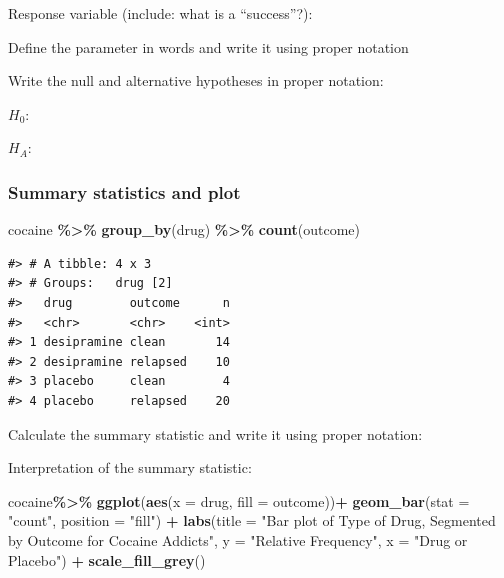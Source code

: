 \documentclass[
]{report}
\newenvironment{Shaded}{\begin{snugshade}}{\end{snugshade}}
\newcommand{\AttributeTok}[1]{\textcolor[rgb]{0.13,0.29,0.53}{#1}}
\newcommand{\FunctionTok}[1]{\textcolor[rgb]{0.13,0.29,0.53}{\textbf{#1}}}
\newcommand{\NormalTok}[1]{#1}
\newcommand{\SpecialCharTok}[1]{\textcolor[rgb]{0.81,0.36,0.00}{\textbf{#1}}}
\newcommand{\StringTok}[1]{\textcolor[rgb]{0.31,0.60,0.02}{#1}}
\begin{document}
Response variable (include: what is a ``success''?):

\vspace{0.2in}

Define the parameter in words and write it using proper notation

\vspace{0.5in}

Write the null and alternative hypotheses in proper notation:

\(H_0:\)

\vspace{0.2in}

\(H_A:\)

\vspace{0.2in}

\subsubsection*{Summary statistics and plot}\label{summary-statistics-and-plot}

\begin{Shaded}
\begin{Highlighting}[]
\NormalTok{cocaine }\SpecialCharTok{\%\textgreater{}\%} \FunctionTok{group\_by}\NormalTok{(drug) }\SpecialCharTok{\%\textgreater{}\%} \FunctionTok{count}\NormalTok{(outcome)}
\end{Highlighting}
\end{Shaded}

\begin{verbatim}
#> # A tibble: 4 x 3
#> # Groups:   drug [2]
#>   drug        outcome      n
#>   <chr>       <chr>    <int>
#> 1 desipramine clean       14
#> 2 desipramine relapsed    10
#> 3 placebo     clean        4
#> 4 placebo     relapsed    20
\end{verbatim}

Calculate the summary statistic and write it using proper notation:

\vspace{0.3in}

Interpretation of the summary statistic:

\vspace{0.4in}

\begin{Shaded}
\begin{Highlighting}[]
\NormalTok{cocaine}\SpecialCharTok{\%\textgreater{}\%}
  \FunctionTok{ggplot}\NormalTok{(}\FunctionTok{aes}\NormalTok{(}\AttributeTok{x =}\NormalTok{ drug, }\AttributeTok{fill =}\NormalTok{ outcome))}\SpecialCharTok{+}
  \FunctionTok{geom\_bar}\NormalTok{(}\AttributeTok{stat =} \StringTok{"count"}\NormalTok{, }\AttributeTok{position =} \StringTok{"fill"}\NormalTok{) }\SpecialCharTok{+}
  \FunctionTok{labs}\NormalTok{(}\AttributeTok{title =} \StringTok{"Bar plot of Type of Drug, Segmented by }
\StringTok{       Outcome for Cocaine Addicts"}\NormalTok{,}
       \AttributeTok{y =} \StringTok{"Relative Frequency"}\NormalTok{,}
       \AttributeTok{x =} \StringTok{"Drug or Placebo"}\NormalTok{) }\SpecialCharTok{+}
    \FunctionTok{scale\_fill\_grey}\NormalTok{()}
\end{Highlighting}
\end{Shaded}
\end{document}
